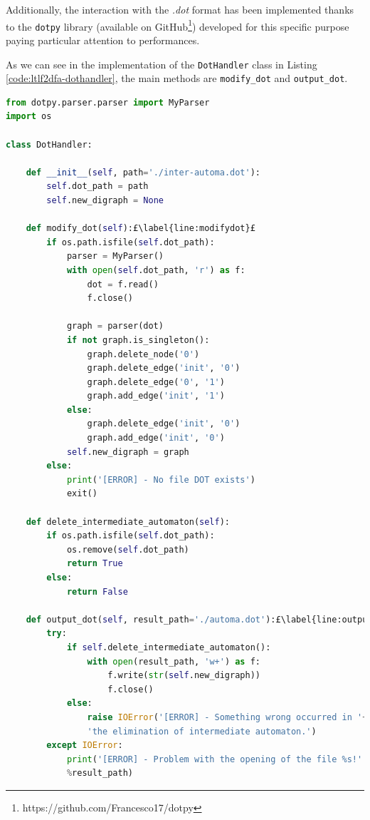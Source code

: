 Additionally, the interaction with the \textit{.dot} format has been implemented thanks to the \texttt{dotpy} library (available on GitHub\footnote{https://github.com/Francesco17/dotpy}) developed for this specific purpose paying particular attention to performances.

As we can see in the implementation of the \texttt{DotHandler} class in Listing \ref{code:ltlf2dfa-dothandler}, the main methods are \texttt{modify\_dot} and \texttt{output\_dot}.
\begin{lstlisting}[language=Python, style=Python, escapechar = £, label={code:ltlf2dfa-dothandler}, caption={The \texttt{DotHandler} class.}]
from dotpy.parser.parser import MyParser
import os

class DotHandler:

    def __init__(self, path='./inter-automa.dot'):
        self.dot_path = path
        self.new_digraph = None

    def modify_dot(self):£\label{line:modifydot}£
        if os.path.isfile(self.dot_path):
            parser = MyParser()
            with open(self.dot_path, 'r') as f:
                dot = f.read()
                f.close()

            graph = parser(dot)
            if not graph.is_singleton():
                graph.delete_node('0')
                graph.delete_edge('init', '0')
                graph.delete_edge('0', '1')
                graph.add_edge('init', '1')
            else:
                graph.delete_edge('init', '0')
                graph.add_edge('init', '0')                
            self.new_digraph = graph
        else:
            print('[ERROR] - No file DOT exists')
            exit()

    def delete_intermediate_automaton(self):
        if os.path.isfile(self.dot_path):
            os.remove(self.dot_path)
            return True
        else:
            return False

    def output_dot(self, result_path='./automa.dot'):£\label{line:outputdot}£
        try:
            if self.delete_intermediate_automaton():
                with open(result_path, 'w+') as f:
                    f.write(str(self.new_digraph))
                    f.close()
            else:
                raise IOError('[ERROR] - Something wrong occurred in '+ \
                'the elimination of intermediate automaton.')
        except IOError:
            print('[ERROR] - Problem with the opening of the file %s!' \
            %result_path)
\end{lstlisting}
